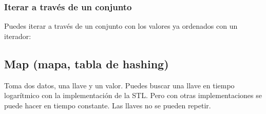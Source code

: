 \documentclass[letterpaper,10pt,spanish]{sphinxmanual}
\begin{document}
\begin{sphinxVerbatim}[commandchars=\\\{\},numbers=left,firstnumber=1,stepnumber=1]
         
    
       
\end{sphinxVerbatim}


\subsubsection{Iterar a través de un conjunto}
\label{\detokenize{edd/no_lineales:iterar-a-traves-de-un-conjunto}}
Puedes iterar a través de un conjunto con los valores ya ordenados con un iterador:

\begin{sphinxVerbatim}[commandchars=\\\{\},numbers=left,firstnumber=1,stepnumber=1]
           
            
      
\end{sphinxVerbatim}


\subsection{Map (mapa, tabla de hashing)}
\label{\detokenize{edd/no_lineales:map-mapa-tabla-de-hashing}}
Toma dos datos, una llave y un valor. Puedes buscar una llave en tiempo logarítmico con la implementación de la STL. Pero con otras implementaciones se puede hacer en tiempo constante. Las llaves no se pueden repetir.
\end{document}
